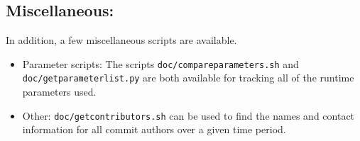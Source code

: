 \subsection{Miscellaneous:} \label{ssec:miscScripts}
In addition, a few miscellaneous scripts are available.
\begin{itemize}
	\item Parameter scripts: The scripts \texttt{doc/compareparameters.sh} and \texttt{doc/getparameterlist.py} are both available for tracking all of the runtime parameters used. 
	\item Other: \texttt{doc/getcontributors.sh} can be used to find the names and contact information for all commit authors over a given time period. 
\end{itemize}